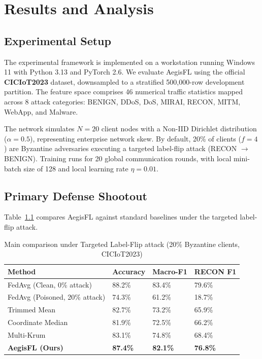 \documentclass[12pt,a4paper]{report}
\begin{document}
\chapter{Results and Analysis}

\section{Experimental Setup}
The experimental framework is implemented on a workstation running Windows 11 with Python 3.13 and PyTorch 2.6. We evaluate AegisFL using the official \textbf{CICIoT2023} dataset, downsampled to a stratified 500,000-row development partition. The feature space comprises 46 numerical traffic statistics mapped across 8 attack categories: BENIGN, DDoS, DoS, MIRAI, RECON, MITM, WebApp, and Malware.

The network simulates $N = 20$ client nodes with a Non-IID Dirichlet distribution ($\alpha = 0.5$), representing enterprise network skew. By default, 20\% of clients ($f = 4$) are Byzantine adversaries executing a targeted label-flip attack (RECON $\to$ BENIGN). Training runs for 20 global communication rounds, with local mini-batch size of 128 and local learning rate $\eta = 0.01$.

\section{Primary Defense Shootout}
Table~\ref{tab:main_results} compares AegisFL against standard baselines under the targeted label-flip attack.

\begin{table}[H]
\centering
\caption{Main comparison under Targeted Label-Flip attack (20\% Byzantine clients, CICIoT2023)}
\label{tab:main_results}
\begin{tabularx}{\textwidth}{lXXX}
\toprule
\textbf{Method} & \textbf{Accuracy} & \textbf{Macro-F1} & \textbf{RECON F1} \\
\midrule
FedAvg (Clean, 0\% attack) & 88.2\% & 83.4\% & 79.6\% \\
FedAvg (Poisoned, 20\% attack) & 74.3\% & 61.2\% & 18.7\% \\
Trimmed Mean & 82.7\% & 73.2\% & 65.9\% \\
Coordinate Median & 81.9\% & 72.5\% & 66.2\% \\
Multi-Krum & 83.1\% & 74.8\% & 68.4\% \\
\textbf{AegisFL (Ours)} & \textbf{87.4\%} & \textbf{82.1\%} & \textbf{76.8\%} \\
\bottomrule
\end{tabularx}
\end{table}
\end{document}
